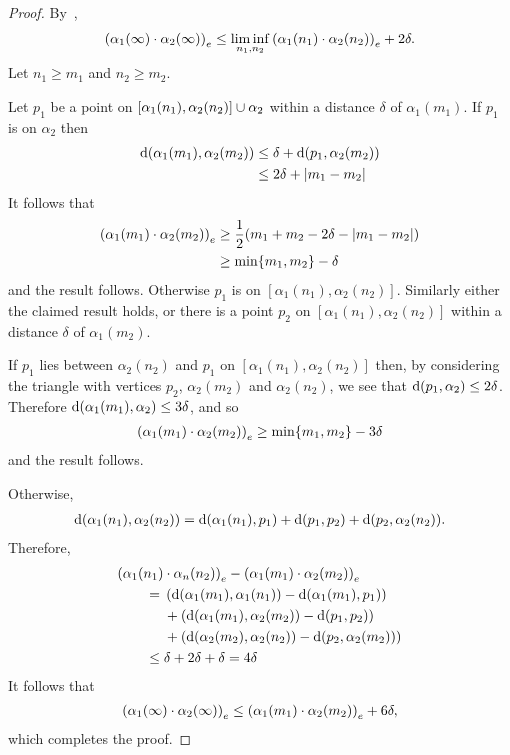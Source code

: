 \documentclass[a4paper]{article}
\begin{document}
\begin{proof}
  By~\cite{bridsonhaefliger99},
  \begin{align*}
    \gromov{e}{\alpha_1(\infty)}{\alpha_2(\infty)} \leq \liminf_{n_1, n_2}
        \gromov{e}{\alpha_1(n_1)}{\alpha_2(n_2)} + 2\delta.
  \end{align*}
  Let $n_1 \geq m_1$ and $n_2 \geq m_2$. 
  
  Let $p_1$ be a point on $[\alpha_1(n_1), \alpha_2(n_2)] \union \alpha_2$
  within a distance $\delta$ of $\alpha_1(m_1)$.  If $p_1$ is on $\alpha_2$
  then
  \begin{align*}
    \dist(\alpha_1(m_1), \alpha_2(m_2)) 
      & \leq \delta + \dist(p_1, \alpha_2(m_2)) \\
      & \leq 2\delta + \abs{m_1 - m_2}
  \end{align*}
  It follows that
  \begin{align*}
    \gromov{e}{\alpha_1(m_1)}{\alpha_2(m_2)} 
      &\geq \frac{1}{2}(m_1 + m_2 - 2\delta - \abs{m_1 - m_2})\\
      &\geq \min\{m_1, m_2\} - \delta
  \end{align*} 
  and the result follows. Otherwise $p_1$ is on $[\alpha_1(n_1),
  \alpha_2(n_2)]$. Similarly either the claimed result holds, or there is a
  point $p_2$ on $[\alpha_1(n_1), \alpha_2(n_2)]$ within a
  distance $\delta$ of $\alpha_1(m_2)$.
  
  If $p_1$ lies between $\alpha_2(n_2)$ and $p_1$ on $[\alpha_1(n_1),
  \alpha_2(n_2)]$ then, by considering the triangle with vertices $p_2$,
  $\alpha_2(m_2)$ and $\alpha_2(n_2)$, we see that $\dist(p_1, \alpha_2) \leq
  2\delta$. Therefore $\dist(\alpha_1(m_1), \alpha_2) \leq 3\delta$, and so
  \begin{align*}
    \gromov{e}{\alpha_1(m_1)}{\alpha_2(m_2)} \geq \min\{m_1, m_2\} - 3\delta
  \end{align*}
  and the result follows.

  Otherwise,
  \begin{align*}
    \dist(\alpha_1(n_1), \alpha_2(n_2)) = \dist(\alpha_1(n_1), p_1) +
        \dist(p_1, p_2) + \dist(p_2, \alpha_2(n_2)).
  \end{align*}
  Therefore,
  \begin{align*}
    \mathrlap{\gromov{e}{\alpha_1(n_1)}{\alpha_n(n_2)} - \gromov{e}{\alpha_1(m_1)}{\alpha_2(m_2)}}
    \quad\quad\phantom{{}={}}&\\
           &\mathllap{{}={}}\left(\dist(\alpha_1(m_1), \alpha_1(n_1)) - \dist(\alpha_1(m_1), p_1)\right) \\
           &+ \left(\dist(\alpha_1(m_1), \alpha_2(m_2)) - \dist(p_1, p_2)\right) \\
           &+ \left(\dist(\alpha_2(m_2), \alpha_2(n_2)) - \dist(p_2, \alpha_2(m_2))\right) \\
           &\mathllap{{}\leq{}} \delta+2\delta+\delta=4\delta 
  \end{align*}
  It follows that
  \begin{align*}
    \gromov{e}{\alpha_1(\infty)}{\alpha_2(\infty)} \leq \gromov{e}{\alpha_1(m_1)}{\alpha_2(m_2)} + 6\delta,
  \end{align*}
  which completes the proof.
\end{proof}
\end{document}
